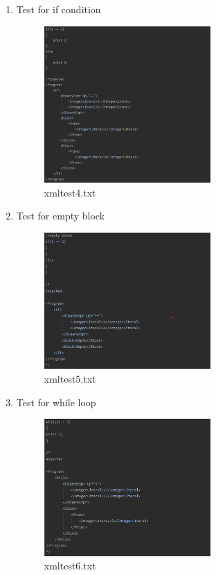\documentclass{article}
\begin{document}
\begin{enumerate}
				\item Test for if condition
				\begin{figure}[H]
					\centering
			 			\includegraphics[width=0.6\textwidth]{xmltest4.png}
			 			\centering
			  			\caption{xmltest4.txt}
			  			\label{fig:xmltest4}
					\end{figure}
					
			\item Test for empty block 
			\begin{figure}[H]
					\centering
			 			\includegraphics[width=0.6\textwidth]{xmltest5.png}
			 			\centering
			  			\caption{xmltest5.txt}
			  			\label{fig:xmltest5}
					\end{figure}	
					
					\item Test for while loop
					\begin{figure}[H]
					\centering
			 			\includegraphics[width=0.6\textwidth]{xmltest6.png}
			 			\centering
			  			\caption{xmltest6.txt}
			  			\label{fig:xmltest6}
					\end{figure}
					

\end{enumerate}
\end{document}
